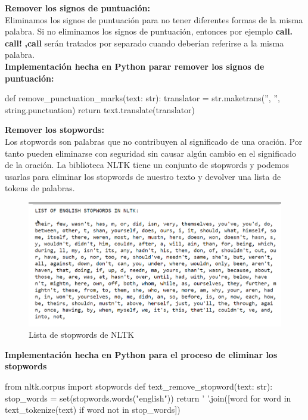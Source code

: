 \documentclass{llncs}
\begin{document}
\noindent
\textbf{Remover los signos de puntuación:}\\ 
\noindent
Eliminamos los signos de puntuación para no tener diferentes formas de la misma palabra. 
Si no eliminamos los signos de puntuación, entonces  por ejemplo \textbf{call.} \textbf{call!} 
\textbf{,call}  serán tratados por separado cuando deberían referirse a la misma palabra.
\\
\textbf{Implementación hecha en Python parar remover los signos de puntuación:}
\begin{python}
    def remove_punctuation_marks(text: str):
        translator = str.maketrans('', '', string.punctuation)
        return text.translate(translator)
\end{python}

\noindent
\textbf{Remover los stopwords:}\\ 
\noindent
Los stopwords son palabras que no contribuyen al significado de una oración. Por tanto
pueden eliminarse con seguridad sin causar algún cambio en el significado de la oración.
La biblioteca NLTK tiene un conjunto de stopwords y podemos usarlas para eliminar 
los stopwords de nuestro texto y devolver una lista de tokens de palabras. 

\begin{figure}
    \caption{Lista de stopwords de NLTK}
    \includegraphics[scale = .3]{./images/englis_stopwords_nltk.png}
\end{figure}

\noindent
\textbf{Implementación hecha en Python para el proceso de eliminar los stopwords}

\begin{python}
    from nltk.corpus import stopwords
    def text_remove_stopword(text: str):
        stop_words = set(stopwords.words("english"))  
        return ' '.join([word for word in text_tokenize(text) if word not in stop_words])
    
\end{python}
\end{document}
